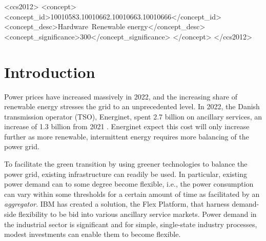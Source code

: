 \documentclass[sigconf]{acmart}
\begin{document}
\begin{CCSXML}
    <ccs2012>
    <concept>
    <concept_id>10010583.10010662.10010663.10010666</concept_id>
    <concept_desc>Hardware~Renewable energy</concept_desc>
    <concept_significance>300</concept_significance>
    </concept>
    </ccs2012>
\end{CCSXML}




\maketitle

\section{Introduction}

Power prices have increased massively in 2022, and the increasing share of renewable energy stresses the grid to an unprecedented level. In 2022, the Danish transmission operator (TSO), Energinet, spent 2.7 billion on ancillary services, an increase of 1.3 billion from 2021 \cite{energinetOmkostninger}. Energinet expect this cost will only increase further as more renewable, intermittent energy requires more balancing of the power grid.

To facilitate the green transition by using greener technologies to balance the power grid, existing infrastructure can readily be used. In particular, existing power demand can to some degree become flexible, i.e., the power consumption can vary within some thresholds for a certain amount of time as facilitated by an \textit{aggregator}. IBM has created a solution, the Flex Platform, that harness demand-side flexibility to be bid into various ancillary service markets. Power demand in the industrial sector is significant and for simple, single-state industry processes, modest investments can enable them to become flexible.
\end{document}
